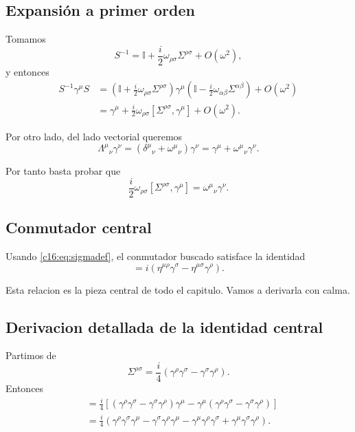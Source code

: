 \subsection{Expansión a primer orden}
Tomamos
\begin{equation}
S^{-1}=\mathbb{I}+\frac{i}{2}\omega_{\rho\sigma}\Sigma^{\rho\sigma}+O(\omega^2),
\end{equation}
y entonces
\begin{align}
S^{-1}\gamma^\mu S
&=
\left(\mathbb{I}+\frac{i}{2}\omega_{\rho\sigma}\Sigma^{\rho\sigma}\right)
\gamma^\mu
\left(\mathbb{I}-\frac{i}{2}\omega_{\alpha\beta}\Sigma^{\alpha\beta}\right)+O(\omega^2)
\\
&=
\gamma^\mu+\frac{i}{2}\omega_{\rho\sigma}[\Sigma^{\rho\sigma},\gamma^\mu]+O(\omega^2).
\label{c16:eq:firstorder}
\end{align}

Por otro lado, del lado vectorial queremos
\begin{equation}
\Lambda^\mu{}_\nu\gamma^\nu
=
(\delta^\mu{}_\nu+\omega^\mu{}_\nu)\gamma^\nu
=
\gamma^\mu+\omega^\mu{}_\nu\gamma^\nu.
\label{c16:eq:vectorial}
\end{equation}

Por tanto basta probar que
\begin{equation}
\frac{i}{2}\omega_{\rho\sigma}[\Sigma^{\rho\sigma},\gamma^\mu]
=
\omega^\mu{}_\nu\gamma^\nu.
\label{c16:eq:need}
\end{equation}

\subsection{Conmutador central}
Usando \eqref{c16:eq:sigmadef}, el conmutador buscado satisface la identidad
\begin{equation}
[\Sigma^{\rho\sigma},\gamma^\mu]
=
i(\eta^{\mu\rho}\gamma^\sigma-\eta^{\mu\sigma}\gamma^\rho).
\label{c16:eq:master}
\end{equation}

Esta relacion es la pieza central de todo el capitulo. Vamos a derivarla con calma.

\subsection{\texorpdfstring{Derivacion detallada de la identidad central}{Derivacion detallada de la identidad central}}
Partimos de
\begin{equation}
\Sigma^{\rho\sigma}=\frac{i}{4}(\gamma^\rho\gamma^\sigma-\gamma^\sigma\gamma^\rho).
\end{equation}
Entonces
\begin{align}
[\Sigma^{\rho\sigma},\gamma^\mu]
&=
\frac{i}{4}
\left[
(\gamma^\rho\gamma^\sigma-\gamma^\sigma\gamma^\rho)\gamma^\mu
-\gamma^\mu(\gamma^\rho\gamma^\sigma-\gamma^\sigma\gamma^\rho)
\right]
\\
&=
\frac{i}{4}
\left(
\gamma^\rho\gamma^\sigma\gamma^\mu
-\gamma^\sigma\gamma^\rho\gamma^\mu
-\gamma^\mu\gamma^\rho\gamma^\sigma
+\gamma^\mu\gamma^\sigma\gamma^\rho
\right).
\label{c16:eq:longcomm}
\end{align}

